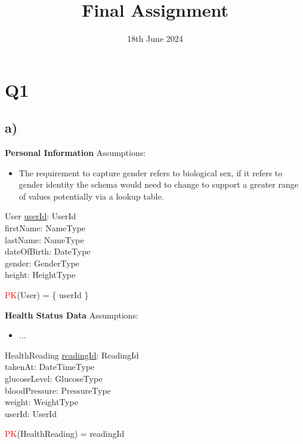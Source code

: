 \documentclass{article}
\title{Final Assignment}
\date{\vspace{-1.0cm}18th June 2024}
\begin{document}
\maketitle

\section*{Q1}

\subsection*{\small a)}


\textbf{Personal Information}
\newline \newline Assumptions:
\begin{itemize}
  \item The requirement to capture gender refers to biological sex, if it refers to gender identity the schema would need to change to support a greater range of values potentially via a lookup table.
\end{itemize}
\begin{schema}{User}
	\underline{userId}: UserId \\
	firstName: NameType \\
	lastName: NameType \\
    dateOfBirth: DateType \\
    gender: GenderType \\
    height: HeightType \\ 
\end{schema}
\begin{zed}
\textcolor{red}{PK}(User) = \{ userId \} \\
\end{zed}

\vspace{0.2cm}
\hspace{-0.5cm}\textbf{Health Status Data}
\newline \newline Assumptions:
\begin{itemize}
  \item ... 
\end{itemize}

\begin{schema}{HealthReading}
	\underline{readingId}: ReadingId \\
    takenAt: DateTimeType \\
    glucoseLevel: GlucoseType \\
    bloodPressure: PressureType \\ 
    weight: WeightType \\
    userId: UserId \\
\end{schema}
\begin{zed}
\textcolor{red}{PK}(HealthReading) = { readingId } \\
\end{zed}
    
\end{document}
